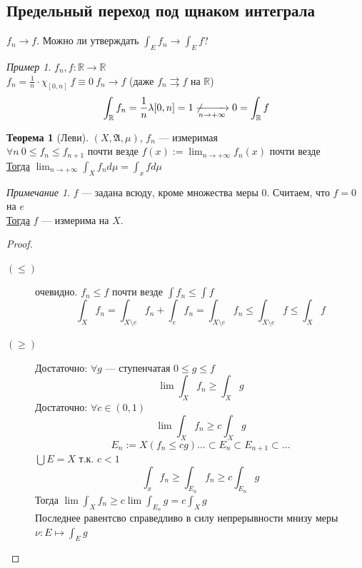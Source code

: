 \documentclass[oneside]{book}
\newcommand{\R}{\mathbb{R}}
\newcommand{\A}{\mathfrak{A}}
\theoremstyle{plain}
\theoremstyle{remark}
\newtheorem*{remark}{Примечание}
\newtheorem*{examp}{Пример}
\theoremstyle{definition}
\newtheorem{theorem}{Теорема}[section]
\begin{document}
\subsection{Предельный переход под щнаком интеграла}
\label{sec:org2fc001a}
\(f_n \to f\). Можно ли утверждать \(\int_E f_n \to \int_E f\)?
\begin{examp}
\(f_n, f: \R \to \R\) \\
\(f_n = \frac{1}{n} \cdot \chi_{[0, n]}\ f\equiv 0\ f_n \to f\) (даже \(f_n \rightrightarrows f\) на \(\R\)) \\
\[ \int_\R f_n = \frac{1}{n}\lambda[0, n] = 1\not \xrightarrow[n \to + \infty]{} 0 = \int_\R f \]
\end{examp}
\begin{theorem}[Леви]
\((X, \A, \mu)\), \(f_n\) --- измеримая \\
\(\forall n\ 0 \le f_n \le f_{n + 1}\)  почти везде \(f(x) := \lim_{n\to + \infty} f_n(x)\) почти везде \\
\uline{Тогда} \(\lim_{n \to + \infty}\int_X f_n d \mu = \int_x fd\mu\)
\end{theorem}
\begin{remark}
\(f\) --- задана всюду, кроме множества меры \(0\). Считаем, что \(f = 0\) на \(e\) \\
\uline{Тогда} \(f\) --- измерима на \(X\).
\end{remark}
\begin{proof}
\-
\begin{description}
\item[{\((\le)\)}] очевидно. \(f_n \le f\) почти везде \(\int f_n \le \int f\)
\[ \int_X f_n = \int_{X\setminus e}f_n + \int_e f_n = \int_{X\setminus e} f_n \le \int_{X \setminus e} f \le \int_X f \]
\item[{\((\ge)\)}] Достаточно: \(\forall g\) --- ступенчатая \(0 \le g \le f\)
\[ \lim \int_X f_n \ge \int_X g \]
Достаточно: \(\forall c \in (0, 1)\)
\[ \lim \int_X f_n \ge c \int_X g \]
\[ E_n := X(f_n \le c g) \dots \subset E_n \subset E_{n + 1} \subset \dots \]
\(\bigcup E = X\) т.к. \(c < 1\)
\[ \int_x f_n \ge \int_{E_n} f_n \ge c \int_{E_n} g \]
Тогда \(\lim \int_X f_n \ge c \lim \int_{E_n} g = c\int_X g\) \\
Последнее равентсво справедливо в силу непрерывности мнизу меры \(\nu: E \mapsto \int_E g\)
\end{description}
\end{proof}
\end{document}

